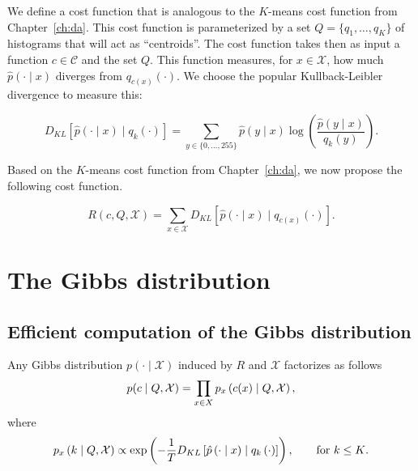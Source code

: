 We define a cost function that is analogous to the $K$-means cost function
from Chapter~\ref{ch:da}. This cost function is parameterized by a set $Q = \{q_1, \ldots, q_K\}$ of histograms that will act as ``centroids''. The cost function
takes then as input a function $c \in \mathcal{C}$ and the set $Q$. This function measures, for $x \in \mathcal{X}$, how much
$\hat{p}\left(\cdot \mid x\right)$ diverges from $q_{c(x)}\left(\cdot\right)$. We choose the popular Kullback-Leibler divergence
to measure this:

\begin{equation}
D_{KL}\left[\hat{p}\left(\cdot \mid x\right) \mid q_k\left(\cdot\right)\right] = \sum_{y \in \{0, \ldots, 255\}} \hat{p}\left(y \mid x\right) \log \left(\frac{\hat{p}\left(y \mid x\right)}{q_k\left(y\right)}\right).
\end{equation}

Based on the $K$-means cost function from Chapter~\ref{ch:da}, we now propose the following cost function.

\begin{definition}
\begin{equation}
R(c, Q, \mathcal{X}) = \sum_{x \in \mathcal{X}} D_{KL}\left[\hat{p}\left(\cdot \mid x\right) \mid q_{c(x)}\left(\cdot\right)\right].
\end{equation}
\end{definition}

\section{The Gibbs distribution}

\subsection{Efficient computation of the Gibbs distribution}

\begin{lemma}
Any Gibbs distribution $p(\cdot \mid \mathcal{X})$ induced by $R$ and $\mathcal{X}$ factorizes as follows
%
\begin{equation}
p(c \mid Q, \mathcal{X}) = \prod_{x \in X} p_{x} \left(c(x)\mid Q, \mathcal{X}\right),
\end{equation}
%
where
%
\begin{equation}
p_{x} \left(k\mid Q, \mathcal{X}\right) \propto \exp\left(-\frac{1}{T}D_{KL}\left[\hat{p}\left(\cdot \mid x\right) \mid q_{k}\left(\cdot \right)\right]\right), \qquad \text{for $k \leq K$}.
\end{equation}
%
\end{lemma}

